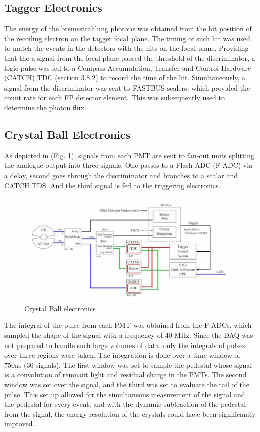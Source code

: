 \subsection{Tagger Electronics}

\indent The energy of the bremsstrahlung photons was obtained from the hit position of the recoiling electron on the tagger focal plane. The timing of such hit was used to match the events in the detectors with the hits on the focal plane. Providing that the a signal from the focal plane passed the threshold of the discriminator, a logic pulse was fed to a Compass Accumulation, Transfer and Control Hardware (CATCH) TDC (section 3.8.2) to record the time of the hit. Simultaneously, a signal from the discriminator was sent to FASTBUS scalers, which provided the count rate for each FP detector element. This was subsequently used to determine the photon flux.

\subsection{Crystal Ball Electronics}

\indent As depicted in (Fig. \ref{cbelectronics}), signals from each PMT are sent to fan-out units splitting the analogue output into three signals. One passes to a Flash ADC (F-ADC) via a delay, second goes through the discriminator and branches to a scalar and CATCH TDS. And the third signal is fed to the triggering electronics.

\begin{figure}[H]
\begin{center}
\includegraphics[scale=1.0]{pictures/png/cbelectronics.png}
\caption{Crystal Ball electronics \cite{krambrich}.}
\label{cbelectronics}
\end{center}
\end{figure}

\indent The integral of the pulse from each PMT was obtained from the F-ADCs, which sampled the shape of the signal with a frequency of 40 MHz. Since the DAQ was not prepared to handle such large volumes of data, only the integrals of pulses over three regions were taken. The integration is done over a time window of 750ns (30 signals). The first window was set to sample the pedestal whose signal is a convolution of remnant light and residual charge in the PMTs. The second window was set over the signal, and the third was set to evaluate the tail of the pulse. This set up allowed for the simultaneous measurement of the signal and the pedestal for every event, and with the dynamic subtraction of the pedestal from the signal, the energy resolution of the crystals could have been significantly improved.

